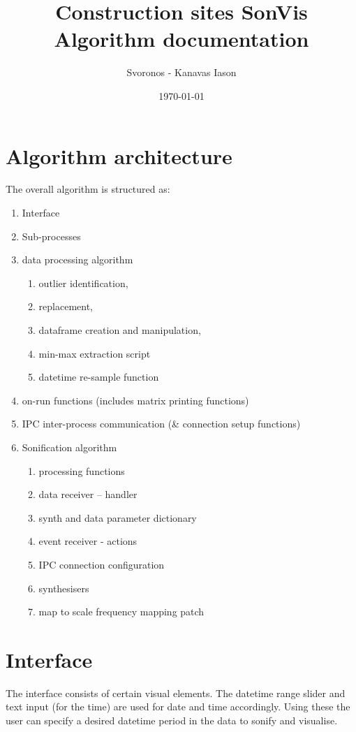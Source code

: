 \documentclass[11pt]{article}
\author{Svoronos - Kanavas Iason}
\date{\today}
\title{Construction sites SonVis Algorithm documentation}
\begin{document}
\maketitle
\tableofcontents


\section{Algorithm architecture}
\label{sec:org1f77fbb}
The overall algorithm is structured as:
\begin{enumerate}
\item Interface
\item Sub-processes
\item data processing algorithm
\begin{enumerate}
\item outlier identification,
\item replacement,
\item dataframe creation and manipulation,
\item min-max extraction script
\item datetime re-sample function
\end{enumerate}
\item on-run functions (includes matrix printing functions)
\item IPC inter-process communication (\& connection setup functions)
\item Sonification algorithm
\begin{enumerate}
\item processing functions
\item data receiver -- handler
\item synth and data parameter dictionary
\item event receiver - actions
\item IPC connection configuration
\item synthesisers
\item map to scale frequency mapping patch
\end{enumerate}
\end{enumerate}

\section{Interface}
\label{sec:orgaae3c83}
The interface consists of certain visual elements.
The datetime range slider and text input (for the time) are used for date and time accordingly. Using these the user can specify a desired datetime period in the data to sonify and visualise.
\end{document}

